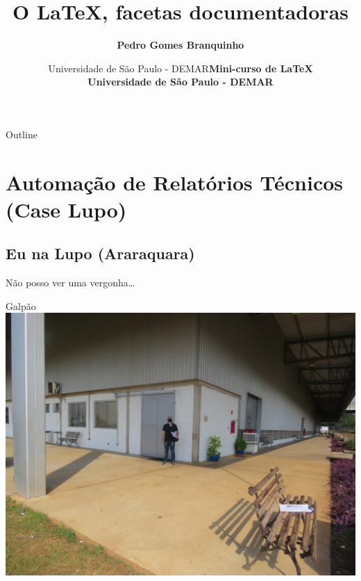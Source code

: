 \documentclass[bigger]{beamer}
\date{  Universidade de São Paulo - DEMAR}
\title{O \LaTeX{}, facetas documentadoras}
\author[Branquinho]{\textbf{Pedro Gomes Branquinho \\ \text{\scriptsize{pedro.branquinho@usp.br}}}}
\date[EEL-USP]{\textbf{\scriptsize{Mini-curso de \LaTeX} \\ Universidade de São Paulo - DEMAR}}
\begin{document}
\maketitle
\begin{frame}{Outline}
\tableofcontents
\end{frame}



\section{Automação de Relatórios Técnicos (Case Lupo)}
\label{sec:org6a20b9d}
{


\subsection{Eu na Lupo (Araraquara)}
\label{sec:org316cd4d}
\begin{frame}[label={sec:orgaee2454}]{Não posso ver uma vergonha\ldots{}}
\begin{block}{Galpão}
\href{img/galpao-lupo.jpeg}{\includegraphics[width=\textwidth]{./img/galpao-lupo.jpeg}}
\end{block}
\end{frame}

}
\end{document}
